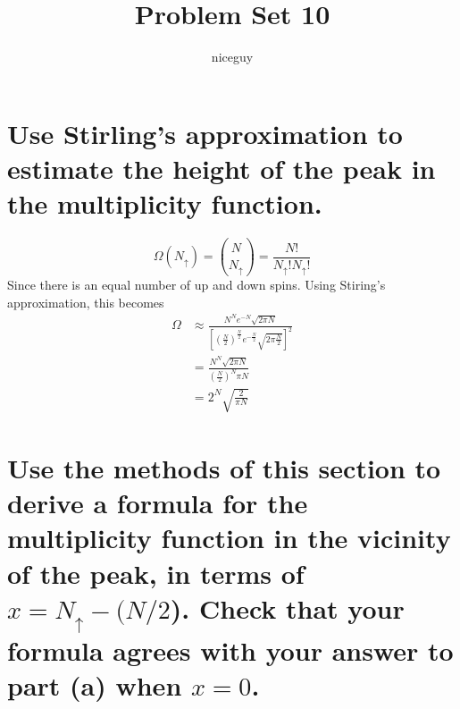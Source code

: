\documentclass[answers]{exam}
\author{niceguy}
\title{Problem Set 10}
\begin{document}
\maketitle

\begin{questions}


\begin{parts}
	\part{Use Stirling's approximation to estimate the height of the peak in the multiplicity function.}

	\begin{solution}
		$$\Omega(N_\uparrow) = \binom{N}{N_\uparrow} = \frac{N!}{N_\uparrow ! N_\uparrow !}$$
		Since there is an equal number of up and down spins. Using Stiring's approximation, this becomes
		\begin{align*}
			\Omega &\approx \frac{N^Ne^{-N}\sqrt{2\pi N}}{\left[\left(\frac{N}{2}\right)^{\frac{N}{2}}e^{-\frac{N}{2}}\sqrt{2\pi\frac{N}{2}}\right]^2} \\
			       &= \frac{N^N\sqrt{2\pi N}}{\left(\frac{N}{2}\right)^N\pi N} \\
			       &= 2^N\sqrt{\frac{2}{\pi N}}
		\end{align*}
	\end{solution}

	\part{Use the methods of this section to derive a formula for the multiplicity function in the vicinity of the peak, in terms of $x = N_\uparrow - (N /2$). Check that your formula agrees with your answer to part (a) when $x = 0$.}


\end{parts}
\end{questions}
\end{document}
